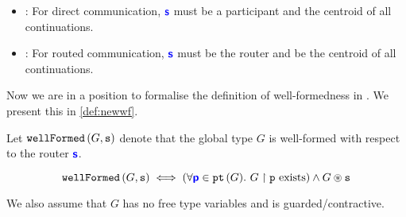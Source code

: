 \begin{itemize}
\item 
{}:
For direct communication, ${\color{blue}\bm{\mathsf{s}}}$ must
be a participant and the centroid of all continuations.

\item 
{}:
For routed communication, ${\color{blue}\bm{\mathsf{s}}}$ must
be the router and be the centroid of all continuations.

\end{itemize}

Now we are in a position to formalise the definition
of well-formedness in \newtheory. We present this in
\cref{def:newwf}.

\begin{definition}
Let $\textnormal{\texttt{wellFormed}}\left(G, {\mathtt{s}}\right)$ 
denote that the global type $G$
is well-formed with respect to the router ${\color{blue}\bm{\mathsf{s}}}$.

\[
\textnormal{\texttt{wellFormed}}\left(G, {\mathtt{s}}\right) \iff 
(\forall {\color{blue}\bm{\mathsf{p}}} \in {\textnormal{\texttt{pt}}\left({G}\right)}. ~ {G} \upharpoonright {\mathtt{p}} \text{ exists})
\wedge
{G} \circledast {\mathtt{s}}
\]

We also assume that $G$ has no free type variables
and is guarded/contractive.

\label{def:newwf}
\end{definition}